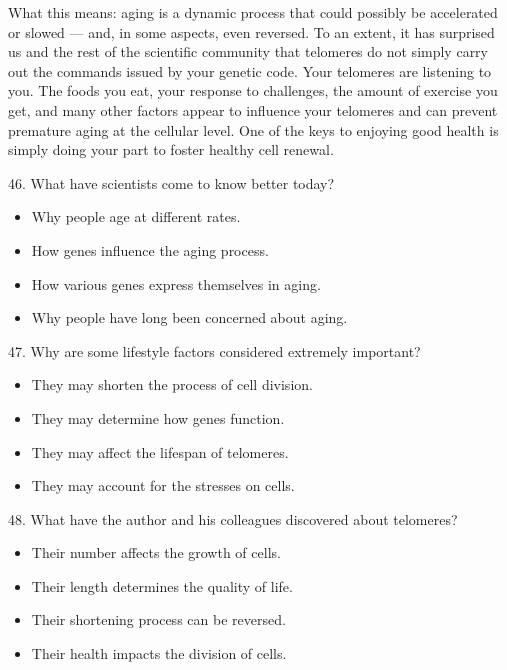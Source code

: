 \documentclass[UTF8,11pt]{ctexart}
\begin{document}
What this means: aging is a dynamic process that could possibly be accelerated or slowed — and, in some aspects, even reversed. To an extent, it has surprised us and the rest of the scientific community that telomeres do not simply carry out the commands issued by your genetic code. Your telomeres are listening to you. The foods you eat, your response to challenges, the amount of exercise you get, and many other factors appear to influence your telomeres and can prevent premature aging at the cellular level. One of the keys to enjoying good health is simply doing your part to foster healthy cell renewal.


46. What have scientists come to know better today?


\begin{itemize}[leftmargin=2em,itemsep=.2em,topsep=.4em]\item[A.] Why people age at different rates.
\item[B.] How genes influence the aging process.
\item[C.] How various genes express themselves in aging.
\item[D.] Why people have long been concerned about aging.
\end{itemize}

47. Why are some lifestyle factors considered extremely important?


\begin{itemize}[leftmargin=2em,itemsep=.2em,topsep=.4em]\item[A.] They may shorten the process of cell division.
\item[B.] They may determine how genes function.
\item[C.] They may affect the lifespan of telomeres.
\item[D.] They may account for the stresses on cells.
\end{itemize}

48. What have the author and his colleagues discovered about telomeres?


\begin{itemize}[leftmargin=2em,itemsep=.2em,topsep=.4em]\item[A.] Their number affects the growth of cells.
\item[B.] Their length determines the quality of life.
\item[C.] Their shortening process can be reversed.
\item[D.] Their health impacts the division of cells.
\end{itemize}
\end{document}
